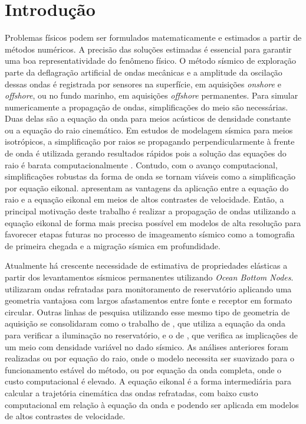 \chapter{Introdução}
\label{ch:introducao}

Problemas físicos podem ser formulados matematicamente e estimados a partir de métodos numéricos. A precisão das soluções estimadas é essencial para garantir uma boa representatividade do fenômeno físico. O método sísmico de exploração parte da deflagração artificial de ondas mecânicas e a amplitude da oscilação dessas ondas é registrada por sensores na superfície, em aquisições \textit{onshore} e \textit{offshore}, ou no fundo marinho, em aquisições \textit{offshore} permanentes. Para simular numericamente a propagação de ondas, simplificações do meio são necessárias. Duas delas são a equação da onda para meios acústicos de densidade constante ou a equação do raio cinemático. Em estudos de modelagem sísmica para meios isotrópicos, a simplificação por raios se propagando perpendicularmente à frente de onda é utilizada gerando resultados rápidos pois a solução das equações do raio é barata computacionalmente \cite{zhang1998nonlinear}. Contudo, com o avanço computacional, simplificações robustas da forma de onda se tornam viáveis como a simplificação por equação eikonal.  apresentam as vantagens da aplicação entre a equação do raio e a equação eikonal em meios de altos contrastes de velocidade. Então, a principal motivação deste trabalho é realizar a propagação de ondas utilizando a equação eikonal de forma mais precisa possível em modelos de alta resolução para favorecer etapas futuras no processo de imageamento sísmico como a tomografia de primeira chegada e a migração sísmica em profundidade.

Atualmente há crescente necessidade de estimativa de propriedades elásticas a partir dos levantamentos sísmicos permanentes utilizando \textit{Ocean Bottom Nodes}.  utilizaram ondas refratadas para monitoramento de reservatório aplicando uma geometria vantajosa com largos afastamentos entre fonte e receptor em formato circular. Outras linhas de pesquisa utilizando esse mesmo tipo de geometria de aquisição se consolidaram como o trabalho de , que utiliza a equação da onda para verificar a iluminação no reservatório, e o de , que verifica as implicações de um meio com densidade variável no dado sísmico. As análises anteriores foram realizadas ou por equação do raio, onde o modelo necessita ser suavizado para o funcionamento estável do método, ou por equação da onda completa, onde o custo computacional é elevado. A equação eikonal é a forma intermediária para calcular a trajetória cinemática das ondas refratadas, com baixo custo computacional em relação à equação da onda e podendo ser aplicada em modelos de altos contrastes de velocidade. 

